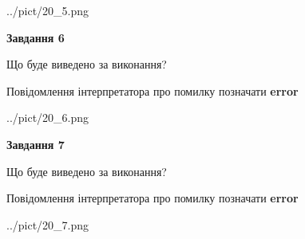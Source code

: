 \documentclass[10pt, ukrainian]{article}
\begin{document}
{\begin {large}
\begin{center}
	{../pict/20_5.png}
\end{center}
\newpage

{\begin {center}\textbf{Завдання 6}\end {center}}\par
Що буде виведено за виконання? \par
Повідомлення інтерпретатора про помилку позначати \textbf{error}

\begin{center}
	{../pict/20_6.png}
\end{center}
\newpage

{\begin {center}\textbf{Завдання 7}\end {center}}\par
Що буде виведено за виконання? \par
Повідомлення інтерпретатора про помилку позначати \textbf{error}

\begin{center}
	{../pict/20_7.png}
\end{center}
\newpage

\end {large}}
\end{document}
